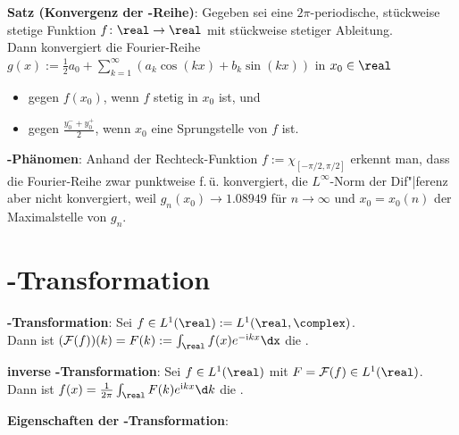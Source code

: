 \textbf{Satz (Konvergenz der -Reihe)}:
Gegeben sei eine $2\pi$-periodische, stückweise stetige Funktion $f\colon \real \to \real$
mit stückweise stetiger Ableitung.\\
Dann konvergiert die Fourier-Reihe
$g(x) := \frac{1}{2} a_0 + \sum_{k=1}^\infty (a_k\cos(kx) + b_k\sin(kx))$ in $x_0 \in \real$
\begin{itemize}
    \item
    gegen $f(x_0)$, wenn $f$ stetig in $x_0$ ist, und

    \item
    gegen $\frac{y_0^- + y_0^+}{2}$, wenn $x_0$ eine Sprungstelle von $f$ ist.
\end{itemize}

\textbf{-Phänomen}:
Anhand der Rechteck-Funktion $f := \chi_{[-\pi/2,\pi/2]}$ erkennt man,
dass die Fourier-Reihe zwar punktweise f.\,ü. konvergiert,
die $L^\infty$-Norm der Dif"|ferenz aber nicht konvergiert,
weil $g_n(x_0) \to 1.08949$ für $n \to \infty$ und $x_0 = x_0(n)$ der Maximalstelle von $g_n$.

\pagebreak

\section{%
    -Transformation%
}

\textbf{-Transformation}:
Sei $f \in L^1(\real) := L^1(\real, \complex)$.\\
Dann ist $(\F(f))(k) = F(k) := \int_\real f(x)e^{-\iu kx} \dx$
die .

\textbf{inverse -Transformation}:
Sei $f \in L^1(\real)$ mit $F = \F(f) \in L^1(\real)$.\\
Dann ist $f(x) = \frac{1}{2\pi} \int_\real F(k) e^{\iu kx}\d k$ die
.

\textbf{Eigenschaften der -Transformation}:

